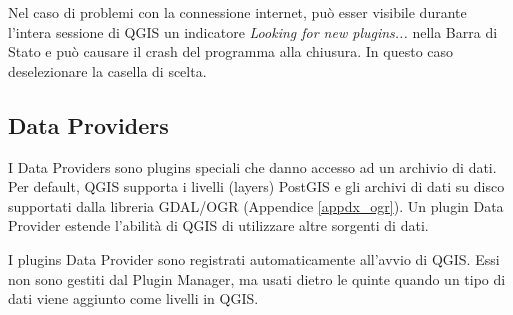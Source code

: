 Nel caso di problemi con la connessione internet, può esser visibile durante l'intera sessione di QGIS un indicatore  \textit{Looking for new plugins...} nella Barra di Stato e può causare il crash del programma alla chiusura. In questo caso deselezionare la casella di scelta.

\subsection{Data Providers}

I Data Providers sono plugins speciali che danno accesso ad un archivio di dati. Per default, QGIS supporta i livelli (layers) PostGIS e gli archivi di dati su disco supportati dalla libreria  GDAL/OGR (Appendice \ref{appdx_ogr}).
Un plugin Data Provider estende l'abilità di QGIS di utilizzare altre sorgenti di dati.

I plugins Data Provider sono registrati automaticamente all'avvio di QGIS. Essi non sono gestiti dal Plugin Manager, ma usati dietro le quinte quando un tipo di dati viene aggiunto come livelli in QGIS.
